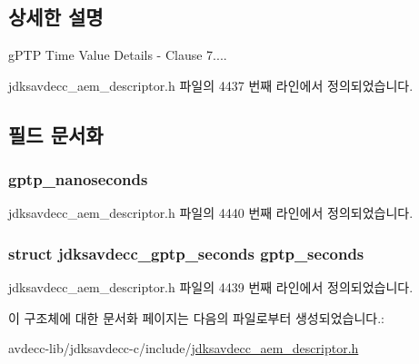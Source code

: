 \subsection{상세한 설명}
g\+P\+TP Time Value Details -\/ Clause 7.... 

jdksavdecc\+\_\+aem\+\_\+descriptor.\+h 파일의 4437 번째 라인에서 정의되었습니다.



\subsection{필드 문서화}
\subsubsection[{\texorpdfstring{gptp\+\_\+nanoseconds}{gptp_nanoseconds}}]{ gptp\+\_\+nanoseconds}\hypertarget{structjdksavdecc__values__gptp__time_a5365958d411fe32d294129809036c617}{}\label{structjdksavdecc__values__gptp__time_a5365958d411fe32d294129809036c617}


jdksavdecc\+\_\+aem\+\_\+descriptor.\+h 파일의 4440 번째 라인에서 정의되었습니다.

\subsubsection[{\texorpdfstring{gptp\+\_\+seconds}{gptp_seconds}}]{\setlength{\rightskip}{0pt plus 5cm}struct {\bf jdksavdecc\+\_\+gptp\+\_\+seconds} gptp\+\_\+seconds}\hypertarget{structjdksavdecc__values__gptp__time_a188b5eb829d9cabad72f2977aa72be85}{}\label{structjdksavdecc__values__gptp__time_a188b5eb829d9cabad72f2977aa72be85}


jdksavdecc\+\_\+aem\+\_\+descriptor.\+h 파일의 4439 번째 라인에서 정의되었습니다.



이 구조체에 대한 문서화 페이지는 다음의 파일로부터 생성되었습니다.\+:\begin{DoxyCompactItemize}
\item 
avdecc-\/lib/jdksavdecc-\/c/include/\hyperlink{jdksavdecc__aem__descriptor_8h}{jdksavdecc\+\_\+aem\+\_\+descriptor.\+h}\end{DoxyCompactItemize}

